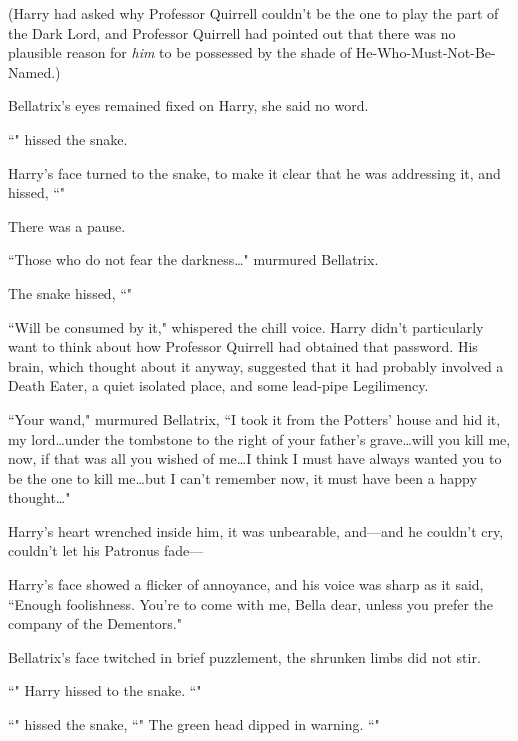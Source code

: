(Harry had asked why Professor Quirrell couldn't be the one to play the part of the Dark Lord, and Professor Quirrell had pointed out that there was no plausible reason for \emph{him} to be possessed by the shade of He-Who-Must-Not-Be-Named.)

Bellatrix's eyes remained fixed on Harry, she said no word.

``" hissed the snake.

Harry's face turned to the snake, to make it clear that he was addressing it, and hissed, ``"

There was a pause.

``Those who do not fear the darkness…" murmured Bellatrix.

The snake hissed, ``"

``Will be consumed by it," whispered the chill voice. Harry didn't particularly want to think about how Professor Quirrell had obtained that password. His brain, which thought about it anyway, suggested that it had probably involved a Death Eater, a quiet isolated place, and some lead-pipe Legilimency.

``Your wand," murmured Bellatrix, ``I took it from the Potters' house and hid it, my lord…under the tombstone to the right of your father's grave…will you kill me, now, if that was all you wished of me…I think I must have always wanted you to be the one to kill me…but I can't remember now, it must have been a happy thought…"

Harry's heart wrenched inside him, it was unbearable, and—and he couldn't cry, couldn't let his Patronus fade—

Harry's face showed a flicker of annoyance, and his voice was sharp as it said, ``Enough foolishness. You're to come with me, Bella dear, unless you prefer the company of the Dementors."

Bellatrix's face twitched in brief puzzlement, the shrunken limbs did not stir.

``" Harry hissed to the snake. ``"

``" hissed the snake, ``" The green head dipped in warning. ``"

